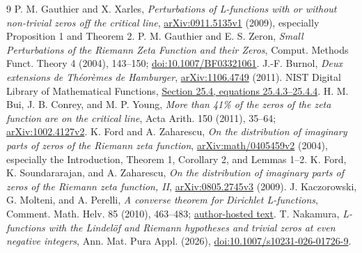 \documentclass[11pt,a4paper]{article}
\theoremstyle{definition}
\theoremstyle{remark}
\begin{document}
\begin{thebibliography}{9}
P. M. Gauthier and X. Xarles,
\emph{Perturbations of L-functions with or without non-trivial zeros off the
critical line}, \href{https://arxiv.org/abs/0911.5135}{arXiv:0911.5135v1} (2009),
especially Proposition 1 and Theorem 2.
P. M. Gauthier and E. S. Zeron,
\emph{Small Perturbations of the Riemann Zeta Function and their Zeros},
Comput. Methods Funct. Theory 4 (2004), 143--150;
\href{https://doi.org/10.1007/BF03321061}{doi:10.1007/BF03321061}.
J.-F. Burnol, \emph{Deux extensions de Th\'eor\`emes de Hamburger},
\href{https://arxiv.org/abs/1106.4749}{arXiv:1106.4749} (2011).
NIST Digital Library of Mathematical Functions,
\href{https://dlmf.nist.gov/25.4}{Section 25.4, equations 25.4.3--25.4.4}.
H. M. Bui, J. B. Conrey, and M. P. Young,
\emph{More than 41\% of the zeros of the zeta function are on the critical line},
Acta Arith. 150 (2011), 35--64;
\href{https://arxiv.org/abs/1002.4127}{arXiv:1002.4127v2}.
K. Ford and A. Zaharescu,
\emph{On the distribution of imaginary parts of zeros of the Riemann zeta function},
\href{https://arxiv.org/abs/math/0405459}{arXiv:math/0405459v2} (2004),
especially the Introduction, Theorem 1, Corollary 2, and Lemmas 1--2.
K. Ford, K. Soundararajan, and A. Zaharescu,
\emph{On the distribution of imaginary parts of zeros of the Riemann zeta function, II},
\href{https://arxiv.org/abs/0805.2745}{arXiv:0805.2745v3} (2009).
J. Kaczorowski, G. Molteni, and A. Perelli,
\emph{A converse theorem for Dirichlet L-functions},
Comment. Math. Helv. 85 (2010), 463--483;
\href{https://sites.unimi.it/molteni/research/papers-pdf/23-molteni-A_converse_theorem_for_Dirichlet_L-functions.pdf}{author-hosted text}.
T. Nakamura,
\emph{L-functions with the Lindel\"of and Riemann hypotheses and trivial zeros
at even negative integers}, Ann. Mat. Pura Appl. (2026),
\href{https://doi.org/10.1007/s10231-026-01726-9}{doi:10.1007/s10231-026-01726-9}.
\end{thebibliography}
\end{document}
